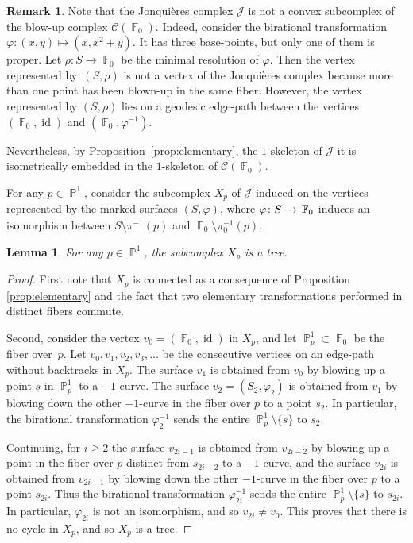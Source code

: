 \documentclass[JEP,XML,SOM,Unicode, NoEqCountersInSection,published]{cedram}
\newcommand{\dradpl}{{\hspace*{-2.5mm}\begin{tikzcd}[ampersand replacement=\&,column sep = scriptsize]\mbox{}\ar[r,dashed]\&\mbox{}\end{tikzcd}\hspace*{-2.5mm}}}
\newcommand{\dratst}{{\hspace*{-2.5mm}\begin{tikzcd}[ampersand replacement=\&,column sep = small]\mbox{}\ar[r,dashed]\&\mbox{}\end{tikzcd}\hspace*{-2mm}}}
\let\drascst\dratst
\newcommand{\dra}{\mathchoice{\dradpl}{\dratst}{\drascst}{\drascst}}
\let\dashrightarrow\dra
\newcommand{\p}{\operatorname{\mathbb{P}}}\let\P\p
\newcommand{\F}{\operatorname{\mathbb{F}}}
\newcommand{\id}{\operatorname{id}}
\newcommand{\Jon}{\mathscr{J}}
\theoremstyle{plain}
\newtheorem{lemma}[theorem]{Lemma}
\theoremstyle{definition}
\newtheorem{remark}[theorem]{Remark}
\begin{document}
\begin{remark}\label{remark:not_convex}
Note that the Jonquières complex $\Jon$ is not a convex subcomplex of the blow-up complex $\mathcal C(\F_0)$. Indeed, consider the birational transformation \hbox{$\varphi:(x,y)\mapsto (x,x^2+y)$}. It has three base-points, but only one of them is proper. Let $\rho \colon S\to \F_0$ be the minimal resolution of $\varphi$. Then the vertex represented by~$(S,\rho)$ is not a vertex of the Jonquières complex because more than one point has been blown-up in the same fiber. However, the vertex represented by $(S,
\rho)$ lies on a geodesic edge-path between the vertices $(\F_0,\id)$ and $(\F_0, \varphi^{-1})$.

Nevertheless, by Proposition~\ref{prop:elementary}, the $1$-skeleton of $\mathscr{J}$ it is isometrically embedded in the $1$-skeleton of $\mathcal C(\F_0)$.
\end{remark}

For any $p\in \p^1$, consider the subcomplex $X_p$ of $\mathscr{J}$ induced on the vertices represented by the marked surfaces $(S,\varphi)$, where $\varphi\colon S\dashrightarrow \F_0$ induces an isomorphism between $S\setminus \pi^{-1}(p)$ and $\F_0\setminus \pi_0^{-1}(p)$.

\begin{lemma}
\label{lem:tree}
For any $p\in \p^1$, the subcomplex $X_p$ is a tree.
\end{lemma}

\begin{proof}
First note that $X_p$ is connected as a consequence of Proposition \ref{prop:elementary} and the fact that two elementary transformations performed in distinct fibers commute.

Second, consider the vertex $v_0=(\F_0,\id)$ in $X_p$, and let $\p^1_p\subset \F_0$ be the fiber over~$p$. Let $v_0,v_1,v_2,v_3,\ldots$ be the consecutive vertices on an edge-path without backtracks in $X_p$. The surface $v_1$ is obtained from $v_0$ by blowing up a point {$s$} in $\p^1_p$ to a $-1$-curve. The surface $v_2=(S_2,\varphi_2)$ is obtained from $v_1$ by blowing down the other $-1$-curve in the fiber over $p$ to a point $s_2$. In particular, the birational transformation $\varphi^{-1}_2$ sends the entire {$\p^1_p\setminus \{s\}$} to $s_2$.

Continuing, for $i\geq 2$ the surface $v_{2i-1}$ is obtained from $v_{2i-2}$ by blowing up a point in the fiber over $p$ distinct from $s_{2i-2}$ to a $-1$-curve, and the surface $v_{2i}$ is obtained from $v_{2i-1}$ by blowing down the other $-1$-curve in the fiber over $p$ to a point $s_{2i}$. Thus the birational transformation $\varphi^{-1}_{2i}$ sends the entire {$\p^1_p\setminus \{s\}$} to $s_{2i}$. In particular, $\varphi_{2i}$ {is not an isomorphism}, and so $v_{2i}\neq v_0$. This proves that there is no cycle in $X_p$, and so $X_p$ is a tree.
\end{proof}
\end{document}
